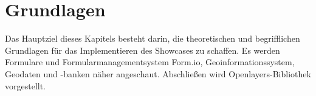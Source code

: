 \chapter{Grundlagen}
\label{sec:Grundlagen}
Das Hauptziel dieses Kapitels besteht darin, die theoretischen und begrifflichen Grundlagen für das Implementieren des Showcases zu schaffen. Es werden Formulare und Formularmanagementsystem Form.io, Geoinformationssystem, Geodaten und -banken näher angeschaut. Abschließen wird Openlayers-Bibliothek vorgestellt.






